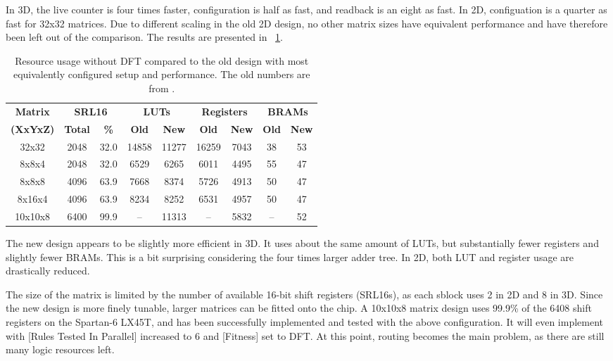 In 3D, the live counter is four times faster, configuration is half as fast, and readback is an eight as fast.
In 2D, configuation is a quarter as fast for 32x32 matrices.
Due to different scaling in the old 2D design, no other matrix sizes have equivalent performance and have therefore been left out of the comparison.
The results are presented in \tablename~\ref{tab:resource-usage}.

\begin{table}[!ht]
    \renewcommand{\arraystretch}{1.4}
    \centering
    \begin{tabular}{c|c|c|c|c|c|c|c|c}
        \bfseries Matrix & \multicolumn{2}{c|}{\bfseries SRL16} & \multicolumn{2}{c|}{\bfseries LUTs} & \multicolumn{2}{c|}{\bfseries Registers} & \multicolumn{2}{c}{\bfseries BRAMs} \\
        \bfseries (XxYxZ) & \bfseries Total & \bfseries \% & \bfseries Old & \bfseries New & \bfseries Old & \bfseries New & \bfseries Old & \bfseries New \\
        \hline
        32x32 & 2048 & 32.0 & 14858 & 11277 & 16259 & 7043 & 38 & 53 \\
        8x8x4 & 2048 & 32.0 & 6529 & 6265 & 6011 & 4495 & 55 & 47 \\
        8x8x8 & 4096 & 63.9 & 7668 & 8374 & 5726 & 4913 & 50 & 47 \\
        8x16x4 & 4096 & 63.9 & 8234 & 8252 & 6531 & 4957 & 50 & 47 \\
        10x10x8 & 6400 & 99.9 & – & 11313 & – & 5832 & – & 52 \\
    \end{tabular}
    \caption[Resource usage]{
        Resource usage without DFT compared to the old design with most equivalently configured setup and performance.
        The old numbers are from \cite{stovneng2014sblock}.
    }
    \label{tab:resource-usage}
\end{table}

The new design appears to be slightly more efficient in 3D.
It uses about the same amount of LUTs, but substantially fewer registers and slightly fewer BRAMs.
This is a bit surprising considering the four times larger adder tree.
In 2D, both LUT and register usage are drastically reduced.

The size of the matrix is limited by the number of available 16-bit shift registers (SRL16s), as each sblock uses 2 in 2D and 8 in 3D.
Since the new design is more finely tunable, larger matrices can be fitted onto the chip.
A 10x10x8 matrix design uses 99.9\% of the 6408 shift registers on the Spartan-6 LX45T, and has been successfully implemented and tested with the above configuration.
It will even implement with [Rules Tested In Parallel] increased to 6 and [Fitness] set to DFT.
At this point, routing becomes the main problem, as there are still many logic resources left.

